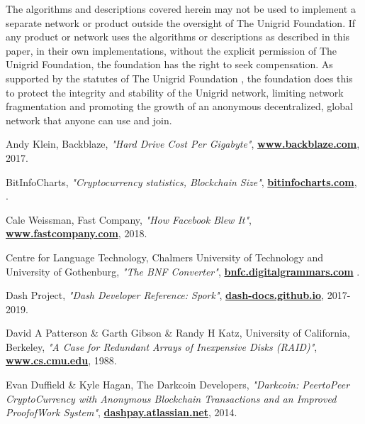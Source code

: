 \documentclass[10pt,a4paper,final]{article}
\let\oldhref\href
\renewcommand{\href}[2]{\oldhref{#1}{\bfseries#2}}
\begin{document}
The algorithms and descriptions covered herein may not be used to implement a separate network or product outside the oversight of The Unigrid Foundation. If any product or network uses the algorithms or descriptions as described in this paper, in their own implementations, without the explicit permission of The Unigrid Foundation, the foundation has the right to seek compensation. As supported by the statutes of The Unigrid Foundation \cite{unigridstatutes}, the foundation does this to protect the integrity and stability of the Unigrid network, limiting network fragmentation and promoting the growth of an anonymous decentralized, global network that anyone can use and join.

\clearpage

\begin{thebibliography}{999}

	Andy Klein, Backblaze,
	\emph{"Hard Drive Cost Per Gigabyte"},
	\href{https://www.backblaze.com/blog/hard-drive-cost-per-gigabyte}{www.backblaze.com},
	2017.

	BitInfoCharts,
	\emph{"Cryptocurrency statistics, Blockchain Size"},
	\href{https://bitinfocharts.com}{bitinfocharts.com},
	\the\year{}.

	Cale Weissman, Fast Company,
	\emph{"How Facebook Blew It"},
	\href{https://www.fastcompany.com/40550423/how-facebook-blew-it}{www.fastcompany.com},
	2018.

	Centre for Language Technology, Chalmers University of Technology and University of Gothenburg,
	\emph{"The BNF Converter"},
	\href{https://bnfc.digitalgrammars.com/}{bnfc.digitalgrammars.com}
	\the\year{}.

	Dash Project,
	\emph{"Dash Developer Reference: Spork"},
	\href{https://dash-docs.github.io/en/developer-reference\%23spork}{dash-docs.github.io},
	2017-2019.

	David A Patterson \& Garth Gibson \& Randy H Katz, University of California, Berkeley,
	\emph{"A Case for Redundant Arrays of Inexpensive Disks (RAID)"},
	\href{https://www.cs.cmu.edu/~garth/RAIDpaper/Patterson88.pdf}{www.cs.cmu.edu},
	1988.

	Evan Duffield \& Kyle Hagan, The Darkcoin Developers,
	\emph{"Darkcoin: Peer­to­Peer Crypto­Currency with Anonymous Blockchain Transactions and an Improved Proof­of­Work System"},
	\href{https://dashpay.atlassian.net/wiki/download/attachments/132120878/Darkcoin\%20Whitepaper.pdf}{dashpay.atlassian.net},
	2014.


\end{thebibliography}
\end{document}
